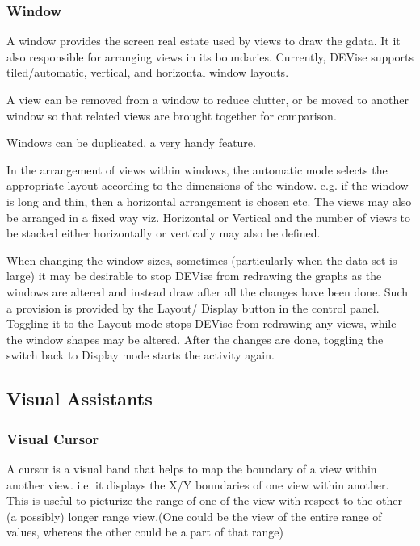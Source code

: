 \subsubsection{Window}

A window provides the screen real estate used by views to draw the
gdata. It it also responsible for arranging views in its
boundaries. Currently, DEVise supports tiled/automatic, vertical, and
horizontal window layouts.

A view can be removed from a window to reduce clutter, or be moved to
another window so that related views are brought together for
comparison.

Windows can be duplicated, a very handy feature.

In the arrangement of views within windows, the automatic mode selects
the appropriate layout according to the dimensions of the
window. e.g. if the window is long and thin, then a horizontal
arrangement is chosen etc. The views may also be arranged in a fixed
way viz. Horizontal or Vertical and the number of views to be stacked
either horizontally or vertically may also be defined.

When changing the window sizes, sometimes (particularly when the data
set is large) it may be desirable to stop DEVise from redrawing the
graphs as the windows are altered and instead draw after all the
changes have been done. Such a provision is provided by the Layout/
Display button in the control panel. Toggling it to the Layout mode
stops DEVise from redrawing any views, while the window shapes may be
altered. After the changes are done, toggling the switch back to
Display mode starts the activity again.

\subsection{Visual Assistants}

\subsubsection{Visual Cursor}

A cursor is a visual band that helps to map the boundary of a view
within another view.  i.e. it displays the X/Y boundaries of one view
within another. This is useful to picturize the range of one of the
view with respect to the other (a possibly) longer range view.(One
could be the view of the entire range of values, whereas the other
could be a part of that range)

